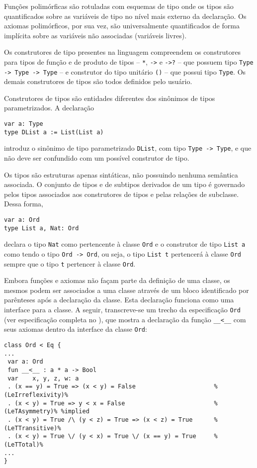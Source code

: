 Funções polimórficas são rotuladas com esquemas de tipo onde os tipos são quantificados sobre as variáveis de tipo no nível mais externo da declaração.
Os axiomas polimórficos, por sua vez, são universalmente quantificados de forma implícita sobre as variáveis não associadas (variáveis livres).

Os construtores de tipo presentes na linguagem \HasCASL compreendem os construtores para tipos de função e de produto de tipos -- \Verb.*., \Verb.->. e \Verb.->?. -- que possuem tipo \Verb.Type -> Type -> Type. -- e construtor do tipo unitário \Verb.(). -- que possui tipo \Verb.Type..
Os demais construtores de tipos são todos definidos pelo usuário.

Construtores de tipos são entidades diferentes dos sinônimos de tipos parametrizados.
A declaração
\begin{Verbatim}
var a: Type
type DList a := List(List a)
\end{Verbatim}
introduz o sinônimo de tipo parametrizado \Verb.DList., com tipo \Verb.Type -> Type., e que não deve ser confundido com um possível construtor de tipo.

Os tipos são estruturas apenas sintáticas, não possuindo nenhuma semântica associada.
O conjunto de tipos e de subtipos derivados de um tipo é governado pelos tipos associados aos construtores de tipos e pelas relações de subclasse.
Dessa forma,
\begin{Verbatim}
var a: Ord
type List a, Nat: Ord
\end{Verbatim}
declara o tipo \Verb.Nat. como pertencente à classe \Verb.Ord. e o construtor de tipo \Verb.List a. como tendo o tipo \Verb.Ord -> Ord., ou seja, o tipo \Verb.List t. pertencerá à classe \Verb.Ord. sempre que o tipo \Verb.t. pertencer à classe \Verb.Ord..

Embora funções e axiomas não façam parte da definição de uma classe, os mesmos podem ser associados a uma classe através de um bloco identificado por parênteses após a declaração da classe.
Esta declaração funciona como uma interface para a classe.
A seguir, transcreve-se um trecho da especificação \Verb.Ord. (ver especificação completa no ), que mostra a declaração da função \Verb.__<__. com seus axiomas dentro da interface da classe \Verb.Ord.:
\begin{Verbatim}
class Ord < Eq {
...
 var a: Ord
 fun __<__ : a * a -> Bool
 var    x, y, z, w: a
 . (x == y) = True => (x < y) = False                      %(LeIrreflexivity)%
 . (x < y) = True => y < x = False                         %(LeTAsymmetry)% %implied
 . (x < y) = True /\ (y < z) = True => (x < z) = True      %(LeTTransitive)%
 . (x < y) = True \/ (y < x) = True \/ (x == y) = True     %(LeTTotal)%
...
}
\end{Verbatim}

